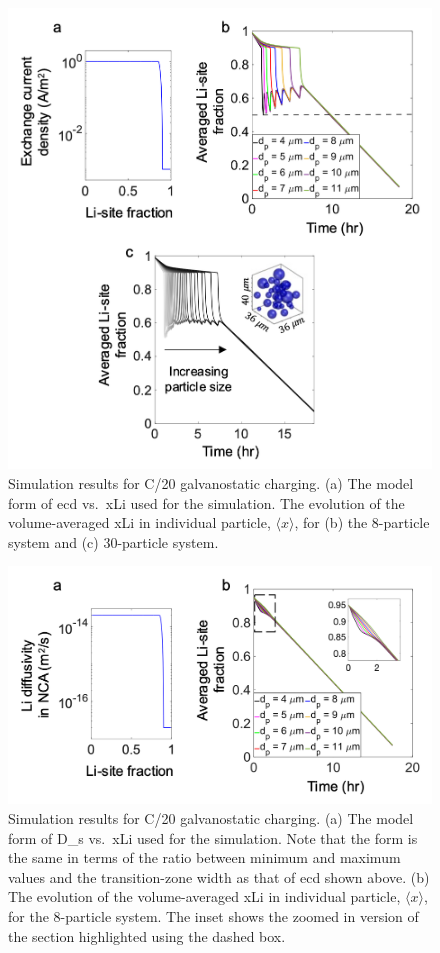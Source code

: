\documentclass{article}
\begin{document}
\newpage
\begin{figure}[!h]
  \includegraphics[scale =0.7]{figures/modeling_figure_1.png}
  \caption{Simulation results for C/20 galvanostatic charging. (a) The
    model form of \gls{ecd} vs.\ \gls{xLi} used for the
    simulation. The evolution of the volume-averaged \gls{xLi} in
    individual particle, $\langle x \rangle$, for (b) the 8-particle
    system and (c) 30-particle system.}
  \label{fig:model-1}
\end{figure}

\newpage
\begin{figure}[!h]
  \includegraphics[scale =0.7]{figures/modeling_figure_2.png}
  \caption{Simulation results for C/20 galvanostatic charging. (a) The
    model form of \gls{D_s} vs.\ \gls{xLi} used for the
    simulation. Note that the form is the same in terms of the ratio
    between minimum and maximum values and the transition-zone width
    as that of \gls{ecd} shown above. (b) The evolution of the
    volume-averaged \gls{xLi} in individual particle, $\langle x
    \rangle$, for the 8-particle system. The inset shows the zoomed in
    version of the section highlighted using the dashed box.}
  \label{fig:model-2}
\end{figure}


\newpage


\end{document}
